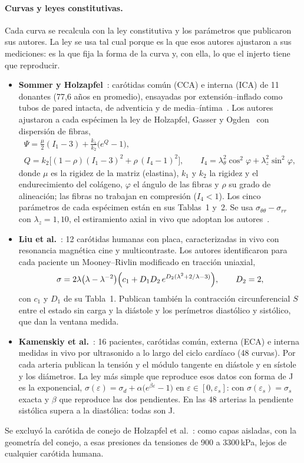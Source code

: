 \paragraph{Curvas y leyes constitutivas.} Cada curva se recalcula con la ley constitutiva y los parámetros que publicaron sus autores. La ley se usa tal cual porque es la que esos autores ajustaron a sus mediciones: es la que fija la forma de la curva y, con ella, lo que el injerto tiene que reproducir.
\begin{itemize}
\item \textbf{Sommer y Holzapfel}~\cite{sommer}: carótidas común (CCA) e interna (ICA) de 11 donantes (77,6 años en promedio), ensayadas por extensión--inflado como tubos de pared intacta, de adventicia y de media--íntima~\cite{sommer2010}. Los autores ajustaron a cada espécimen la ley de Holzapfel, Gasser y Ogden~\cite{holzapfel} con dispersión de fibras,
\begin{gather*}
\Psi=\tfrac{\mu}{2}(I_1-3)+\tfrac{k_1}{k_2}\bigl(e^{Q}-1\bigr),\\
Q=k_2\bigl[(1-\rho)(I_1-3)^2+\rho\,(I_4-1)^2\bigr],\qquad I_4=\lambda_\theta^2\cos^2\varphi+\lambda_z^2\sin^2\varphi,
\end{gather*}
donde $\mu$ es la rigidez de la matriz (elastina), $k_1$ y $k_2$ la rigidez y el endurecimiento del colágeno, $\varphi$ el ángulo de las fibras y $\rho$ su grado de alineación; las fibras no trabajan en compresión ($I_4<1$). Los cinco parámetros de cada espécimen están en sus Tablas~1 y~2. Se usa $\sigma_{\theta\theta}-\sigma_{rr}$ con $\lambda_z=1{,}10$, el estiramiento axial in vivo que adoptan los autores~\cite{sommer2010}.
\item \textbf{Liu et al.}~\cite{liu}: 12 carótidas humanas con placa, caracterizadas in vivo con resonancia magnética cine y multicontraste. Los autores identificaron para cada paciente un Mooney--Rivlin modificado en tracción uniaxial,
\begin{equation*}
\sigma=2\lambda\bigl(\lambda-\lambda^{-2}\bigr)\Bigl(c_1+D_1D_2\,e^{D_2(\lambda^2+2/\lambda-3)}\Bigr),\qquad D_2=2,
\end{equation*}
con $c_1$ y $D_1$ de su Tabla~1. Publican también la contracción circunferencial $S$ entre el estado sin carga y la diástole y los perímetros diastólico y sistólico, que dan la ventana medida.
\item \textbf{Kamenskiy et al.}~\cite{kamenskiy}: 16 pacientes, carótidas común, externa (ECA) e interna medidas in vivo por ultrasonido a lo largo del ciclo cardíaco (48 curvas). Por cada arteria publican la tensión y el módulo tangente en diástole y en sístole y los diámetros. La ley más simple que reproduce esos datos con forma de J es la exponencial, $\sigma(\varepsilon)=\sigma_d+\alpha\bigl(e^{\beta\varepsilon}-1\bigr)$ en $\varepsilon\in[0,\varepsilon_s]$: con $\sigma(\varepsilon_s)=\sigma_s$ exacta y $\beta$ que reproduce las dos pendientes. En las 48 arterias la pendiente sistólica supera a la diastólica: todas son J.
\end{itemize}
Se excluyó la carótida de conejo de Holzapfel et al.~\cite{holzapfel}: como capas aisladas, con la geometría del conejo, a esas presiones da tensiones de 900 a 3300\,kPa, lejos de cualquier carótida humana.

